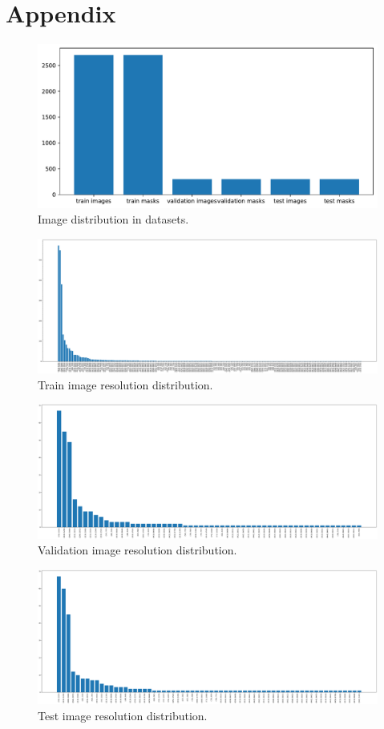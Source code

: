 \section{Appendix}
\label{sec:appendix}

\begin{figure}[htb!]
  \centering
  \includegraphics[width=\textwidth]{assets/datasets.pdf}
  \caption{Image distribution in datasets.}
  \label{datasets}
\end{figure}

\begin{figure}[htb!]
  \centering
  \includegraphics[width=\textwidth]{assets/train_image_resolutions.pdf}
  \caption{Train image resolution distribution.}
  \label{figure:1}
\end{figure}

\clearpage

\begin{figure}[htb!]
  \centering
  \includegraphics[width=\textwidth]{assets/valid_image_resolutions.pdf}
  \caption{Validation image resolution distribution.}
  \label{figure:2}
\end{figure}

\begin{figure}[htb!]
  \centering
  \includegraphics[width=\textwidth]{assets/test_image_resolutions.pdf}
  \caption{Test image resolution distribution.}
  \label{figure:3}
\end{figure}

